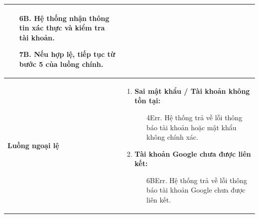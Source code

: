 {\begin{tabularx}{\textwidth}{|>{\raggedright\arraybackslash}p{3.5cm}|>{\raggedright\arraybackslash}X|}
\begin{enumerate}
\begin{enumerate}
        \item[6B.] Hệ thống nhận thông tin xác thực và kiểm tra tài khoản.
        \item[7B.] Nếu hợp lệ, tiếp tục từ bước 5 của luồng chính.
    \end{enumerate}
\end{enumerate} \\
\hline
\textbf{Luồng ngoại lệ} &
\begin{enumerate}
    \item \textbf{Sai mật khẩu / Tài khoản không tồn tại:}
    \begin{enumerate}
        \item[4Err.] Hệ thống trả về lỗi thông báo tài khoản hoặc mật khẩu không chính xác.
    \end{enumerate}
    \item \textbf{Tài khoản Google chưa được liên kết:}
    \begin{enumerate}
        \item[6BErr.] Hệ thống trả về lỗi thông báo tài khoản Google chưa được liên kết.
    \end{enumerate}
\end{enumerate} \\
\hline
\end{tabularx}
}
